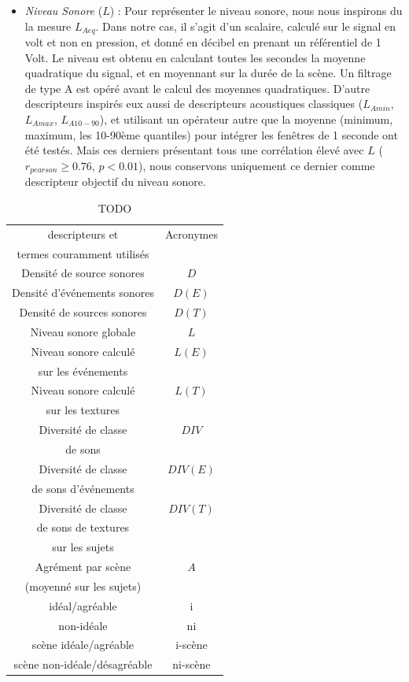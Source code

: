 \begin{itemize}
\begin{itemize}
\item \emph{Niveau Sonore} ($L$) : Pour représenter le niveau sonore, nous nous inspirons du la mesure $L_{Aeq}$. Dans notre cas, il s'agit d'un scalaire, calculé sur le signal en volt et non en pression, et donné en décibel en prenant un référentiel de 1 Volt. Le niveau est obtenu en calculant toutes les secondes la moyenne quadratique du signal, et en moyennant sur la durée de la scène. Un filtrage de type A est opéré avant le calcul des moyennes quadratiques. D'autre descripteurs inspirés eux aussi de descripteurs acoustiques classiques ($L_{Amin}$, $L_{Amax}$, $L_{A10-90}$), et utilisant un opérateur autre que la moyenne (minimum, maximum, les 10-90ème quantiles) pour intégrer les fenêtres de 1 seconde  ont été testés. Mais ces derniers présentant tous une corrélation élevé avec $L$ ($r_{pearson}\geq0.76$, $p<0.01$), nous conservons uniquement ce dernier comme descripteur objectif du niveau sonore.
\end{itemize}
\end{itemize}

\begin{table}[t]
\centering
\begin{tabular}{c c} 
descripteurs et         & Acronymes  \\       
termes couramment utilisés & \\                
\hline
Densité de source sonores    & $D$  \\
Densité d’événements sonores & $D(E)$ \\
Densité de sources sonores   & $D(T)$ \\
Niveau sonore globale        & $L$  \\
Niveau sonore calculé        & $L(E)$ \\
sur les événements           &      \\
Niveau sonore calculé        & $L(T)$ \\
sur les textures             &      \\
Diversité de classe          & $DIV$   \\
de sons                      &         \\
Diversité de classe          & $DIV(E)$\\
de sons d'événements         &         \\
Diversité de classe          & $DIV(T)$\\
de sons de textures          &      \\
sur les sujets               &      \\
Agrément par scène           & $A$  \\
(moyenné sur les sujets)     &      \\
\hline
idéal/agréable                & i \\
non-idéale                    & ni \\
scène idéale/agréable         & i-scène \\
scène non-idéale/désagréable  & ni-scène \\
\hline
\end{tabular}
\vspace{0.5mm}
\caption{TODO}
\label{tab:acronyme}
\end{table}

